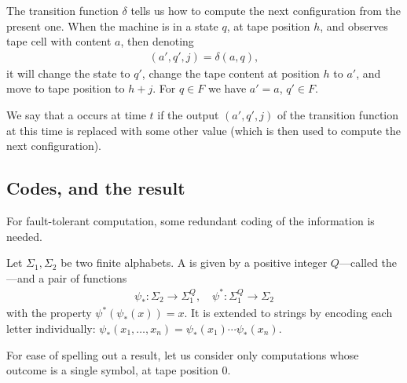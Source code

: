 \documentclass[12pt]{memoir}
\newcommand{\h}{h}
\begin{document}
    The transition function \( \delta \) tells us how to compute the next
    configuration from the present one.
    When the machine is in a state \( q \), at tape position \( \h \), and
    observes tape cell with content \( a \), then denoting
         \begin{align*}
           (a',q',j)=\delta(a,q),
         \end{align*}
    it will change the state to \( q' \), change the
    tape content at position \( \h \) to \( a' \), and move to tape position to \( \h+j \).
    For \( q\in F \) we have \( a'=a \), \( q'\in F \).


\begin{definition}[Fault]\label{def:fault}
    We say that a  occurs at time \( t \) if the output \( (a',q',j) \) of the
    transition function at this time is replaced with some other value
    (which is then used to compute the next configuration).
\end{definition}


\subsection{Codes, and the result}

For fault-tolerant computation, some redundant coding of the information is needed.

\begin{definition}[Codes]\label{def:codes}
    Let \( \Sigma_{1},\Sigma_{2} \) be two finite alphabets.
    A  is given by a positive integer \( Q \)---called
    the ---and a pair of functions
    \begin{align*}
            \psi_{*} :\Sigma_{2}\to\Sigma_{1}^{Q},
            \quad
            \psi^{*}:\Sigma_{1}^{Q}\to\Sigma_{2}
    \end{align*}
    with the property \( \psi^{*}(\psi_{*}(x))=x \).
It is extended to strings by encoding each letter individually:
\( \psi_{*}(x_{1},\dots,x_{n})=\psi_{*}(x_{1})\dotsm\psi_{*}(x_{n}) \).
\end{definition}

For ease of spelling out a result, let us consider only computations whose outcome
is a single symbol, at tape position 0.
\end{document}

